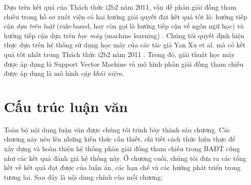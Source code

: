 Dựa trên kết quả của Thách thức i2b2 năm 2011, vấn đề phân giải đồng tham chiếu trong hồ sơ xuất viện có hai hướng giải quyết đạt kết quả tốt là: hướng tiếp cận \emph{dựa trên luật} (rule-based, hay còn gọi là hướng tiếp cận về ngôn ngữ học) và hướng tiếp cận dựa trên \emph{học máy} (machine learning) \cite{OzlemUzuner2012}. Chúng tôi quyết định hiện thực dựa trên hệ thống sử dụng học máy của các tác giả Yan Xu et al. mà có kết quả tốt nhất trong Thách thức i2b2 năm 2011 \cite{YanXu2012}. Trong đó, giải thuật học máy được áp dụng là Support Vector Machine và mô hình phân giải đồng tham chiếu được áp dụng là mô hình \emph{cặp khái niệm}.

\section{Cấu trúc luận văn}
Toàn bộ nội dung luận văn được chúng tôi trình bày thành sáu chương. Các chương này nêu lên những kiến thức cần thiết, chi tiết cách thức hiện thực để xây dựng và hoàn thiện hệ thống phân giải đồng tham chiếu trong BAĐT cũng như các kết quả đánh giá hệ thống này. Ở chương cuối, chúng tôi đưa ra các tổng kết về kết quả đạt được của luận án, các hạn chế và các hướng phát triển trong tương lai. Sau đây là nội dung chính của mỗi chương:

